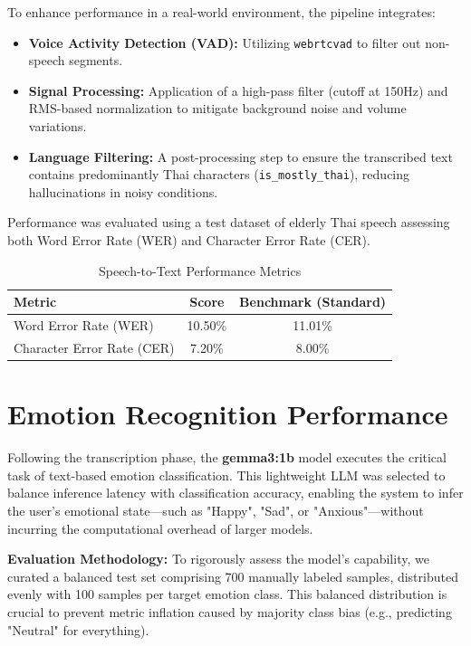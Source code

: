 \noindent\hspace{2.2em}To enhance performance in a real-world environment, the pipeline integrates:
\begin{itemize}
    \item \textbf{Voice Activity Detection (VAD):} Utilizing \texttt{webrtcvad} to filter out non-speech segments.
    \item \textbf{Signal Processing:} Application of a high-pass filter (cutoff at 150Hz) and RMS-based normalization to mitigate background noise and volume variations.
    \item \textbf{Language Filtering:} A post-processing step to ensure the transcribed text contains predominantly Thai characters (\texttt{is\_mostly\_thai}), reducing hallucinations in noisy conditions.
\end{itemize}

\noindent\hspace{2.2em}Performance was evaluated using a test dataset of elderly Thai speech assessing both Word Error Rate (WER) and Character Error Rate (CER).

\begin{table}[hbt!]
    \centering
    \caption{Speech-to-Text Performance Metrics}
    \begin{tabular}{|l|c|c|}
    \hline
    \textbf{Metric} & \textbf{Score} & \textbf{Benchmark (Standard)} \\ \hline
    Word Error Rate (WER) & 10.50\% & 11.01\% \cite{aung-etal-2024-thonburian} \\ \hline
    Character Error Rate (CER) & 7.20\% & 8.00\% \\ \hline
    \end{tabular}
    \label{tab:stt_performance}
\end{table}

\section{Emotion Recognition Performance}
\noindent\hspace{2.2em}Following the transcription phase, the \textbf{gemma3:1b} model executes the critical task of text-based emotion classification. This lightweight LLM was selected to balance inference latency with classification accuracy, enabling the system to infer the user's emotional state—such as "Happy", "Sad", or "Anxious"—without incurring the computational overhead of larger models.

\noindent\textbf{Evaluation Methodology:}
\newline
\noindent\hspace{2.2em}To rigorously assess the model's capability, we curated a balanced test set comprising 700 manually labeled samples, distributed evenly with 100 samples per target emotion class. This balanced distribution is crucial to prevent metric inflation caused by majority class bias (e.g., predicting "Neutral" for everything).

